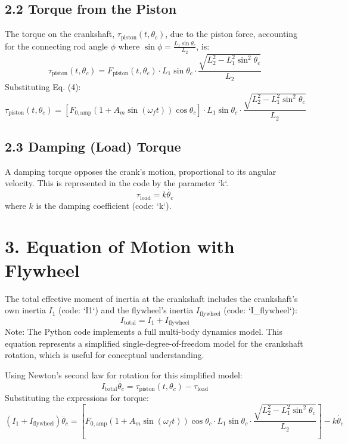 \documentclass[12pt]{article}
\begin{document}
\subsection*{2.2 Torque from the Piston}
The torque on the crankshaft, \(\tau_{\text{piston}}(t, \theta_c)\), due to the piston force, accounting for the connecting rod angle \(\phi\) where \(\sin\phi = \frac{L_1 \sin\theta_c}{L_2}\), is:
\begin{equation}
    \tau_{\text{piston}}(t, \theta_c) = F_{\text{piston}}(t, \theta_c) \cdot L_1 \sin\theta_c \cdot \frac{\sqrt{L_2^2 - L_1^2 \sin^2\theta_c}}{L_2}
\end{equation}
Substituting Eq. (4):
\begin{equation}
    \tau_{\text{piston}}(t, \theta_c) = \left[ F_{0,\text{amp}} (1 + A_m \sin(\omega_f t)) \cos\theta_c \right] \cdot L_1 \sin\theta_c \cdot \frac{\sqrt{L_2^2 - L_1^2 \sin^2\theta_c}}{L_2}
\end{equation}

\subsection*{2.3 Damping (Load) Torque}
A damping torque opposes the crank's motion, proportional to its angular velocity. This is represented in the code by the parameter `k`.
\begin{equation}
    \tau_{\text{load}} = k \dot{\theta_c}
\end{equation}
where \( k \) is the damping coefficient (code: `k`).

\section*{3. Equation of Motion with Flywheel}
The total effective moment of inertia at the crankshaft includes the crankshaft's own inertia \(I_1\) (code: `I1`) and the flywheel's inertia \(I_{\text{flywheel}}\) (code: `I_flywheel`):
\begin{equation}
    I_{\text{total}} = I_1 + I_{\text{flywheel}}
\end{equation}
Note: The Python code implements a full multi-body dynamics model. This equation represents a simplified single-degree-of-freedom model for the crankshaft rotation, which is useful for conceptual understanding.

Using Newton's second law for rotation for this simplified model:
\begin{equation}
    I_{\text{total}} \ddot{\theta_c} = \tau_{\text{piston}}(t, \theta_c) - \tau_{\text{load}}
\end{equation}
Substituting the expressions for torque:
\begin{equation}
    (I_1 + I_{\text{flywheel}}) \ddot{\theta_c} = \left[ F_{0,\text{amp}} (1 + A_m \sin(\omega_f t)) \cos\theta_c \cdot L_1 \sin\theta_c \cdot \frac{\sqrt{L_2^2 - L_1^2 \sin^2\theta_c}}{L_2} \right] - k \dot{\theta_c}
\end{equation}
\end{document}
